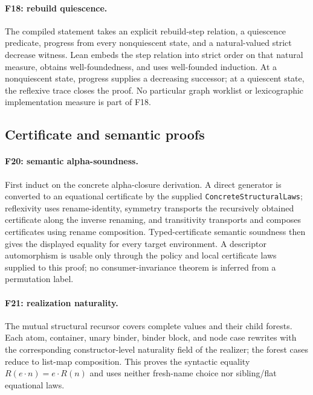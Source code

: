\paragraph{F18: rebuild quiescence.}
\label{app:proof-F18}
The compiled statement takes an explicit rebuild-step relation, a quiescence
predicate, progress from every nonquiescent state, and a natural-valued strict
decrease witness.  Lean embeds the step relation into strict order on that
natural measure, obtains well-foundedness, and uses well-founded induction.
At a nonquiescent state, progress supplies a decreasing successor; at a
quiescent state, the reflexive trace closes the proof.  No particular graph
worklist or lexicographic implementation measure is part of F18.

\subsection{Certificate and semantic proofs}

\paragraph{F20: semantic alpha-soundness.}
\label{app:proof-F20}
First induct on the concrete alpha-closure derivation.  A direct generator is
converted to an equational certificate by the supplied
\texttt{ConcreteStructuralLaws}; reflexivity uses rename-identity, symmetry
transports the recursively obtained certificate along the inverse renaming,
and transitivity transports and composes certificates using rename
composition.  Typed-certificate semantic soundness then gives the displayed
equality for every target environment.  A descriptor automorphism is usable
only through the policy and local certificate laws supplied to this proof; no
consumer-invariance theorem is inferred from a permutation label.

\paragraph{F21: realization naturality.}
\label{app:proof-F21}
The mutual structural recursor covers complete values and their child
forests.  Each atom, container, unary binder, binder block, and node case
rewrites with the corresponding constructor-level naturality field of the
realizer; the forest cases reduce to list-map composition.  This proves the
syntactic equality $R(e\cdot n)=e\cdot R(n)$ and uses neither fresh-name
choice nor sibling/flat equational laws.

